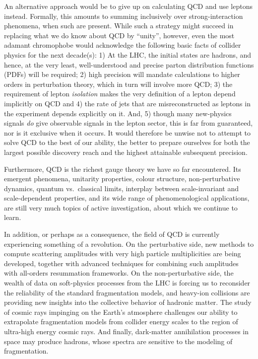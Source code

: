 An alternative approach would be to give up on calculating QCD 
and use leptons instead. Formally, this amounts to summing inclusively over
strong-interaction phenomena, when such are present. While such a
strategy might succeed in replacing what we do know about QCD by
``unity'', however, even the most adamant chromophobe would acknowledge
the following basic facts of collider physics for the next decade(s): 
1) At the LHC, the initial states are
hadrons, and hence, at
the very least, well-understood and precise parton distribution
functions (PDFs) will be required; 2) high precision will mandate
 calculations to higher orders in perturbation theory, 
which in turn will involve more QCD; 3) the requirement of lepton
\emph{isolation} makes the very definition of a lepton
 depend implicitly on QCD and 4) 
 the rate of jets that are misreconstructed as leptons in
 the experiment depends explicitly on it. 
And, 5) though many new-physics signals \emph{do} give observable
signals in the lepton sector, this is far from guaranteed, nor is it
exclusive when it occurs. 
 It would therefore be  unwise not to attempt to solve QCD to the best
 of our ability, the better to prepare ourselves for both the largest
 possible discovery reach and the highest attainable subsequent
 precision. 

Furthermore, QCD is the richest gauge theory we have so far
 encountered. Its emergent phenomena, unitarity properties, colour structure, 
 non-perturbative dynamics, quantum vs.\ classical limits, 
interplay between scale-invariant and
 scale-dependent properties, and its wide
 range of phenomenological applications, are still very much topics of
 active investigation, about which we continue to learn.  

In addition, or perhaps as a consequence, the field of QCD is
currently experiencing something of a revolution. On the perturbative
side, new methods to compute scattering amplitudes with very high
particle multiplicities are being developed, together with advanced
techniques for combining such amplitudes with all-orders resummation
frameworks. On the non-perturbative side, the wealth of data on
soft-physics processes from the LHC is
forcing us to reconsider the reliability of the standard fragmentation
models, and heavy-ion collisions are providing new insights into
the collective behavior of hadronic matter. The
study of cosmic rays impinging on the Earth's
atmosphere challenges our ability to extrapolate fragmentation models
from collider energy scales to the region of ultra-high energy cosmic
rays. And finally, dark-matter annihilation processes in space  may produce 
hadrons, whose spectra are sensitive to the modeling 
of fragmentation.

